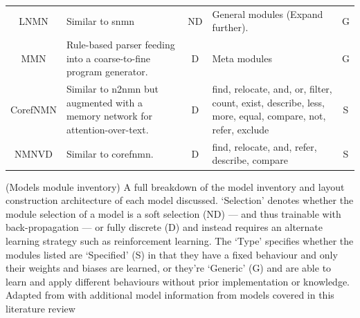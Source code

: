 \begin{table}[]
\begin{tabularx}{\linewidth}{cXcXc}
        LNMN                               & Similar to \gls{snmn}                                                                                             & ND        & General modules (Expand further).                                                                                         & G    \\
        MMN\cite{chen_meta_2020}           & Rule-based parser feeding into a coarse-to-fine program generator.                                                & D         & Meta modules                                                                                                              & G    \\
        CorefNMN\cite{kottur_visual_2018}  & Similar to \gls{n2nmn} but augmented with a memory network for attention-over-text.                               & D         & find, relocate, and, or, filter, count, exist, describe, less, more, equal, compare, not, refer, exclude                  & S    \\
        NMNVD\cite{cho_visual_2021}        & Similar to \gls{corefnmn}.                                                                                        & D         & find, relocate, and, refer, describe, compare                                                                             & S    \\ \bottomrule
    \end{tabularx}
    \captionsource(Models module inventory)
    {A full breakdown of the model inventory and layout construction architecture of each model discussed. `Selection' denotes whether the module selection of a model is a soft selection (ND) --- and thus trainable with back-propagation --- or fully discrete (D) and instead requires an alternate learning strategy such as reinforcement learning. The `Type' specifies whether the modules listed are `Specified' (S) in that they have a fixed behaviour and only their weights and biases are learned, or they're `Generic' (G) and are able to learn and apply different behaviours without prior implementation or knowledge.\label{tab:models_module_inventory}}
    {Adapted from \citeauthor{fishandi_neural_2023}\cite{fishandi_neural_2023} with additional model information from models covered in this literature review}
\end{table}
